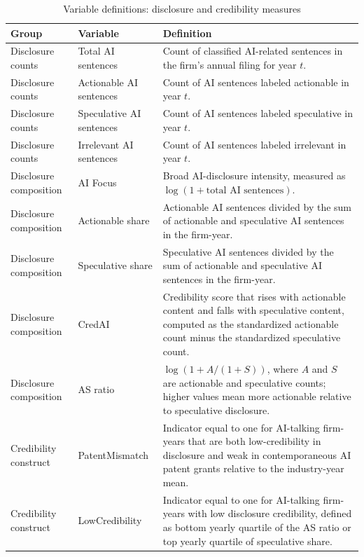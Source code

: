 
\begin{table}[p]
\centering
\small
\setlength{\tabcolsep}{4pt}
\renewcommand{\arraystretch}{1.12}
\caption{Variable definitions: disclosure and credibility measures}
\label{tab:appendix_var_defs}
\begin{tabularx}{\textwidth}{>{\raggedright\arraybackslash}p{}>{\raggedright\arraybackslash}p{}>{\raggedright\arraybackslash}X}
\hline
Group & Variable & Definition \\
\hline
Disclosure counts & Total AI sentences & Count of classified AI-related sentences in the firm's annual filing for year $t$. \\
Disclosure counts & Actionable AI sentences & Count of AI sentences labeled actionable in year $t$. \\
Disclosure counts & Speculative AI sentences & Count of AI sentences labeled speculative in year $t$. \\
Disclosure counts & Irrelevant AI sentences & Count of AI sentences labeled irrelevant in year $t$. \\
Disclosure composition & AI Focus & Broad AI-disclosure intensity, measured as $\log(1 + \text{total AI sentences})$. \\
Disclosure composition & Actionable share & Actionable AI sentences divided by the sum of actionable and speculative AI sentences in the firm-year. \\
Disclosure composition & Speculative share & Speculative AI sentences divided by the sum of actionable and speculative AI sentences in the firm-year. \\
Disclosure composition & CredAI & Credibility score that rises with actionable content and falls with speculative content, computed as the standardized actionable count minus the standardized speculative count. \\
Disclosure composition & AS ratio & $\log(1 + A/(1+S))$, where $A$ and $S$ are actionable and speculative counts; higher values mean more actionable relative to speculative disclosure. \\
Credibility construct & PatentMismatch & Indicator equal to one for AI-talking firm-years that are both low-credibility in disclosure and weak in contemporaneous AI patent grants relative to the industry-year mean. \\
Credibility construct & LowCredibility & Indicator equal to one for AI-talking firm-years with low disclosure credibility, defined as bottom yearly quartile of the AS ratio or top yearly quartile of speculative share. \\

\end{tabularx}
\end{table}
